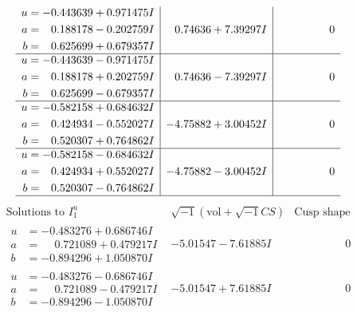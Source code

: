 \documentclass[1p]{elsarticle_modified}
\theoremstyle{definition}
\newcommand{\I}{\sqrt{-1}}
\begin{document}
$$\begin{array}{c|c|c}
\begin{aligned}
u &= -0.443639 + 0.971475 I \\
a &= \phantom{-}0.188178 - 0.202759 I \\
b &= \phantom{-}0.625699 + 0.679357 I\end{aligned}
 & \phantom{-}0.74636 + 7.39297 I & \phantom{-0.000000 } 0 \\ \hline\begin{aligned}
u &= -0.443639 - 0.971475 I \\
a &= \phantom{-}0.188178 + 0.202759 I \\
b &= \phantom{-}0.625699 - 0.679357 I\end{aligned}
 & \phantom{-}0.74636 - 7.39297 I & \phantom{-0.000000 } 0 \\ \hline\begin{aligned}
u &= -0.582158 + 0.684632 I \\
a &= \phantom{-}0.424934 - 0.552027 I \\
b &= \phantom{-}0.520307 + 0.764862 I\end{aligned}
 & -4.75882 + 3.00452 I & \phantom{-0.000000 } 0 \\ \hline\begin{aligned}
u &= -0.582158 - 0.684632 I \\
a &= \phantom{-}0.424934 + 0.552027 I \\
b &= \phantom{-}0.520307 - 0.764862 I\end{aligned}
 & -4.75882 - 3.00452 I & \phantom{-0.000000 } 0\\
 \hline 
 \end{array}$$\newpage$$\begin{array}{c|c|c}  
\text{Solutions to }I^u_{1}& \I (\text{vol} + \sqrt{-1}CS) & \text{Cusp shape}\\
 \hline 
\begin{aligned}
u &= -0.483276 + 0.686746 I \\
a &= \phantom{-}0.721089 + 0.479217 I \\
b &= -0.894296 + 1.050870 I\end{aligned}
 & -5.01547 - 7.61885 I & \phantom{-0.000000 } 0 \\ \hline\begin{aligned}
u &= -0.483276 - 0.686746 I \\
a &= \phantom{-}0.721089 - 0.479217 I \\
b &= -0.894296 - 1.050870 I\end{aligned}
 & -5.01547 + 7.61885 I & \phantom{-0.000000 } 0 \\ \hline\begin{aligned}

\end{aligned}
\end{array}$$
\end{document}
